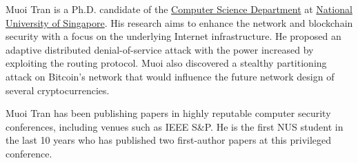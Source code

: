 








\begin{cvparagraph}

Muoi Tran is a Ph.D. candidate of the \href{http://www.comp.nus.edu.sg/about/depts/cs/}{Computer Science Department} at \href{http://nus.edu.sg/}{National University of Singapore}. 
His research aims to enhance the network and blockchain security with a focus on the underlying Internet infrastructure.
He proposed an adaptive distributed denial-of-service attack with the power increased by exploiting the routing protocol.
Muoi also discovered a stealthy partitioning attack on Bitcoin’s network that would influence the future network design of several cryptocurrencies.

Muoi Tran has been publishing papers in highly reputable computer security conferences, including venues such as IEEE S\&P. 
He is the first NUS student in the last 10 years who has published two first-author papers at this privileged conference.



\end{cvparagraph}
